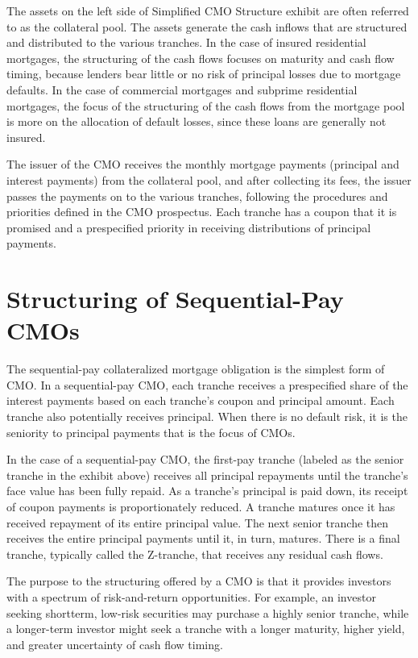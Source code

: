 \documentclass[11pt]{article}
\begin{document}
The assets on the left side of Simplified CMO Structure exhibit are often referred to as the collateral pool. The assets generate the cash inflows that are structured and distributed to the various tranches. In the case of insured residential mortgages, the structuring of the cash flows focuses on maturity and cash flow timing, because lenders bear little or no risk of principal losses due to mortgage defaults. In the case of commercial mortgages and subprime residential mortgages, the focus of the structuring of the cash flows from the mortgage pool is more on the allocation of default losses, since these loans are generally not insured.

The issuer of the CMO receives the monthly mortgage payments (principal and interest payments) from the collateral pool, and after collecting its fees, the issuer passes the payments on to the various tranches, following the procedures and priorities defined in the CMO prospectus. Each tranche has a coupon that it is promised and a prespecified priority in receiving distributions of principal payments.

\section*{Structuring of Sequential-Pay CMOs}
The sequential-pay collateralized mortgage obligation is the simplest form of CMO. In a sequential-pay CMO, each tranche receives a prespecified share of the interest payments based on each tranche's coupon and principal amount. Each tranche also potentially receives principal. When there is no default risk, it is the seniority to principal payments that is the focus of CMOs.

In the case of a sequential-pay CMO, the first-pay tranche (labeled as the senior tranche in the exhibit above) receives all principal repayments until the tranche's face value has been fully repaid. As a tranche's principal is paid down, its receipt of coupon payments is proportionately reduced. A tranche matures once it has received repayment of its entire principal value. The next senior tranche then receives the entire principal payments until it, in turn, matures. There is a final tranche, typically called the Z-tranche, that receives any residual cash flows.

The purpose to the structuring offered by a CMO is that it provides investors with a spectrum of risk-and-return opportunities. For example, an investor seeking shortterm, low-risk securities may purchase a highly senior tranche, while a longer-term investor might seek a tranche with a longer maturity, higher yield, and greater uncertainty of cash flow timing.
\end{document}
